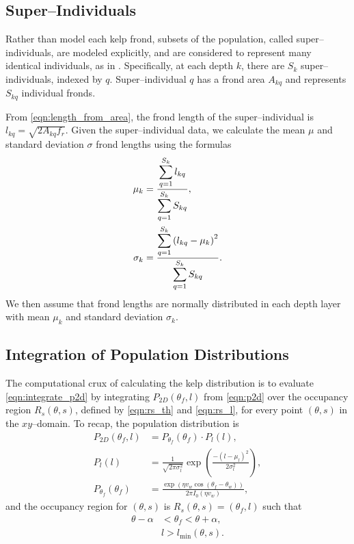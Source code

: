 \subsection{Super--Individuals}
\label{sec:si}
Rather than model each kelp frond, subsets of the population, called super--individuals, are modeled explicitly, and are considered to represent many identical individuals, as in \citep{scheffer_super-individuals_1994}.
Specifically, at each depth $k$, there are $S_k$ super--individuals, indexed by $q$.
Super--individual $q$ has a frond area $A_{kq}$ and represents $S_{kq}$ individual fronds.

From \eqref{eqn:length_from_area}, the frond length of the super--individual is $l_{kq} = \sqrt{2A_{kq}f_r}$.
Given the super--individual data, we calculate the mean $\mu$ and standard deviation $\sigma$ frond
lengths using the formulas
\begin{align}
  \mu_k &= \frac{\displaystyle \sum_{q=1}^{S_k} l_{kq}}{\displaystyle \sum_{q=1}^{S_k} S_{kq}},
  \label{eqn:si_mean} \\
  \sigma_k &= \frac{\displaystyle \sum_{q=1}^{S_k} \left( l_{kq} - \mu_k \right)^2}{\displaystyle \sum_{q=1}^{S_k} S_{kq}}.
  \label{eqn:si_std}
\end{align}
We then assume that frond lengths are normally distributed in each depth layer
with mean $\mu_k$ and standard deviation $\sigma_k$.

\subsection{Integration of Population Distributions}
The computational crux of calculating the kelp distribution is to evaluate \eqref{eqn:integrate_p2d} by integrating $P_{2D}(\theta_f, l)$ from \eqref{eqn:p2d} over the occupancy region $R_s(\theta, s)$, defined by \eqref{eqn:rs_th} and \eqref{eqn:rs_l}, for every point $(\theta,s)$ in the $xy$--domain.
To recap, the population distribution is
\begin{align*}
	P_{2D}(\theta_f,l) &= P_{\theta_f}(\theta_f) \cdot P_l(l), \\
  P_l(l) &= \frac{1}{\sqrt{2\pi\sigma_l^2}}\exp\left(\frac{-(l-\mu_l)^2}{2\sigma_l^2}\right), \\
	P_{\theta_f}(\theta_f) &= \frac{\exp\left(\eta v_w\cos(\theta_f-\theta_w)\right)}{2\pi I_0(\eta v_w)},
\end{align*}
and the occupancy region for $(\theta, s)$ is $R_s(\theta, s) = (\theta_f, l)$ such that
\begin{align*}
	\theta - \alpha &< \theta_f < \theta + \alpha, \\
	&l > l_{\min}(\theta,s).
\end{align*}

